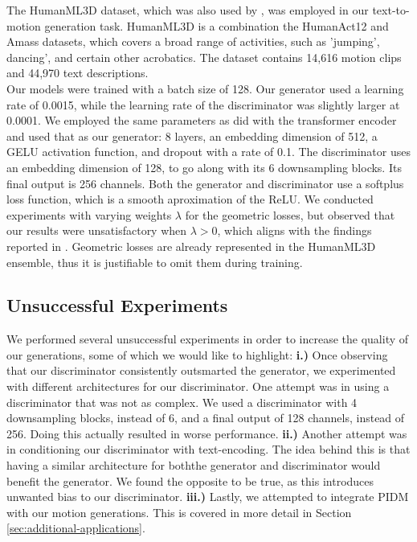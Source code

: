 \documentclass[10pt,twocolumn,letterpaper]{article}
\begin{document}
The HumanML3D dataset, which was also used by \cite{Tevet23}, was employed in our text-to-motion generation task. HumanML3D \cite{Guo_2022_CVPR}
is a combination the HumanAct12 \cite{guo2020action2motion} and Amass \cite{Amass} datasets, which covers a broad range of activities, such as 'jumping', 
dancing', and certain other acrobatics. The dataset contains 14,616 motion clips and 44,970 text descriptions.
\\

Our models were trained with a batch size of 128. Our generator used a learning rate of 0.0015, while the learning rate of the discriminator was slightly 
larger at 0.0001. We employed the same parameters as \cite{Tevet23} did with the transformer encoder and used that as our generator: 8 layers, an embedding 
dimension of 512, a GELU activation function, and dropout with a rate of 0.1. The discriminator uses an embedding dimension of 128, to go along with its 6 
downsampling blocks. Its final output is 256 channels. Both the generator and discriminator use a softplus loss function, which is a smooth aproximation 
of the ReLU. We conducted experiments with varying weights $\lambda$ for the geometric losses, but observed that our results were unsatisfactory when 
$\lambda > 0$, which aligns with the findings reported in \cite{Tevet23}. Geometric losses are already represented in the HumanML3D ensemble, thus it is
justifiable to omit them during training.

\subsection{Unsuccessful Experiments}

We performed several unsuccessful experiments in order to increase the quality of our generations, some of which we would like to highlight: \textbf{i.)} Once observing 
that our discriminator consistently outsmarted the generator, we experimented with different architectures for our discriminator. One attempt was in using a discriminator that was
not as complex. We used a discriminator with 4 downsampling blocks, instead of 6, and a final output of 128 channels, instead of 256.  Doing this actually 
resulted in worse performance. \textbf{ii.)} Another attempt was in conditioning our discriminator with text-encoding. The idea behind this is that having a similar architecture 
for boththe generator and discriminator would benefit the generator. We found the opposite to be true, as this introduces unwanted bias to our discriminator. \textbf{iii.)} Lastly,
we attempted to integrate PIDM with our motion generations. This is covered in more detail in Section \ref{sec:additional-applications}.
\end{document}
